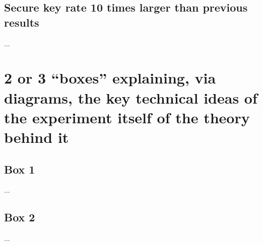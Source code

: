 \documentclass{article}
\begin{document}
\subsection*{Secure key rate 10 times larger than previous results}
...

\section*{2 or 3 “boxes” explaining, via diagrams, the key technical ideas of the experiment itself of the theory behind it}

\subsection*{Box 1}
...

   

\subsection*{Box 2}
...

  
  
\end{document}
